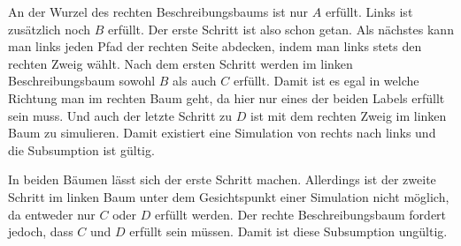 An der Wurzel des rechten Beschreibungsbaums ist nur $A$ erfüllt. Links ist
zusätzlich noch $B$ erfüllt. Der erste Schritt ist also schon getan. Als
nächstes kann man links jeden Pfad der rechten Seite abdecken, indem man links
stets den rechten Zweig wählt. Nach dem ersten Schritt werden im linken
Beschreibungsbaum sowohl $B$ als auch $C$ erfüllt. Damit ist es egal in welche
Richtung man im rechten Baum geht, da hier nur eines der beiden Labels erfüllt
sein muss. Und auch der letzte Schritt zu $D$ ist mit dem rechten Zweig im
linken Baum zu simulieren. Damit existiert eine Simulation von rechts nach links
und die Subsumption ist gültig.

\begin{center}
\begin{minipage}{0.4\textwidth}
\end{minipage}
\begin{minipage}{0.4\textwidth}
\end{minipage}
\end{center}

In beiden Bäumen lässt sich der erste Schritt machen. Allerdings ist der zweite
Schritt im linken Baum unter dem Gesichtspunkt einer Simulation nicht möglich,
da entweder nur $C$ oder $D$ erfüllt werden. Der rechte Beschreibungsbaum
fordert jedoch, dass $C$ und $D$ erfüllt sein müssen. Damit ist diese
Subsumption ungültig.
